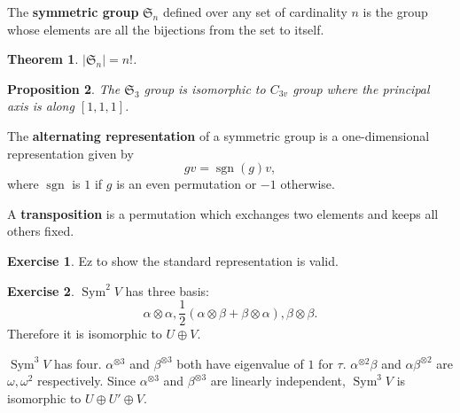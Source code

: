 \documentclass[12pt, letterpaper]{article}
\newcommand{\sgn}{\operatorname{sgn}}
\newcommand{\Sym}{\operatorname{Sym}}
\newcommand{\card}[1]{\left\lvert #1 \right\rvert}
\newtheorem{prop}{Proposition}[section]
\newtheorem{thm}[prop]{Theorem}
\theoremstyle{definition}
\theoremstyle{remark}
\theoremstyle{definition}
\newtheorem{exe}{Exercise}[section]
\theoremstyle{plain}
\numberwithin{equation}{section}
\begin{document}
	\begin{def*}
		The \textbf{symmetric group} $\mathfrak{S}_n$ defined over any set of cardinality $n$
		is the group whose elements are all the bijections from the set to itself.
	\end{def*}
	\begin{thm}\label{thmSymGrpCard}
		$\card{\mathfrak{S}_n} = n!$.
	\end{thm}
	\begin{prop}
		The $\mathfrak{S}_3$ group is isomorphic to $C_{3v}$ group where the principal axis is along $[1,1,1]$.
	\end{prop}
	\begin{def*}
		The \textbf{alternating representation} of a symmetric group
		is a one-dimensional representation given by
		\[gv=\sgn(g)v,\]
		where $\sgn$ is $1$ if $g$ is an even permutation or $-1$ otherwise.
	\end{def*}
	\begin{def*}[transposition]
		A \textbf{transposition} is a permutation which exchanges two elements and keeps all others fixed.
	\end{def*}
	\begin{exe}
		Ez to show the standard representation is valid.
	\end{exe}
	\begin{exe}
		$\Sym^2V$ has three basis:
		\[
		\alpha\otimes\alpha, \frac{1}{2}(\alpha\otimes\beta+\beta\otimes\alpha), \beta\otimes\beta.
		\]
		Therefore it is isomorphic to $U\oplus V$.
		
		$\Sym^3V$ has four.
		$\alpha^{\otimes3}$ and $\beta^{\otimes3}$ both have eigenvalue of $1$ for $\tau$.
		$\alpha^{\otimes2}\beta$ and $\alpha\beta^{\otimes2}$ are $\omega, \omega^2$ respectively.
		Since $\alpha^{\otimes3}$ and $\beta^{\otimes3}$ are linearly independent,
		$\Sym^3V$ is isomorphic to $U\oplus U' \oplus V$.
	\end{exe}
\end{document}
